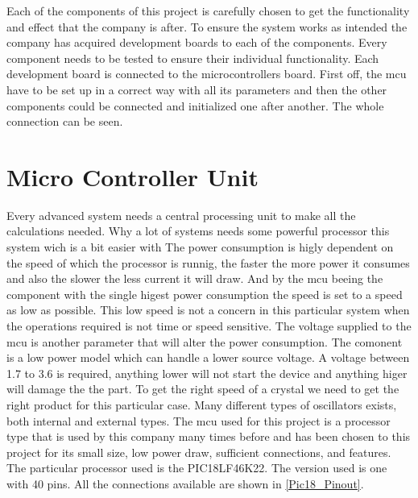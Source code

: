 Each of the components of this project is carefully chosen to get the functionality and effect that the company is after. To ensure the system works as intended the company has acquired development boards to each of the components. Every component needs to be tested to ensure their individual functionality. Each development board is connected to the microcontrollers board. First off, the \gls{mcu} have to be set up in a correct way with all its parameters and then the other components could be connected and initialized one after another. The whole connection can be seen. %




\section{Micro Controller Unit}
Every advanced system needs a central processing unit to make all the calculations needed. Why a lot of systems needs some powerful processor this system wich is a bit easier with 
The power consumption is higly dependent on the speed of which the processor is runnig, the faster the more power it consumes and also the slower the less current it will draw. And by the \gls{mcu} beeing the component with the single higest power consumption the speed is set to a speed as low as possible. This low speed is not a concern in this particular system when the operations required is not time or speed sensitive. The voltage supplied to the \gls{mcu} is another parameter that will alter the power consumption. The comonent is a low power model which can handle a lower source voltage. A voltage between 1.7 to 3.6 is required, anything lower will not start the device and anything higer will damage the the part. 
To get the right speed of a crystal we need to get the right product for this particular case. 
Many different types of oscillators exists, both internal and external types. 
The \gls{mcu} used for this project is a processor type that is used by this company many times before and has been chosen to this project for its small size, low power draw, sufficient connections, and features. The particular processor used is the PIC18LF46K22\cite{pic18}. The version used is one with 40 pins. All the connections available are shown in \autoref{Pic18_Pinout}.

